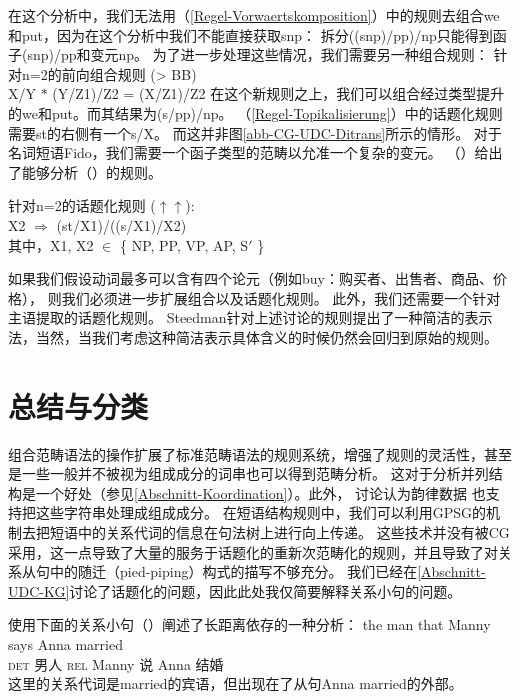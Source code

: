 在这个分析中，我们无法用（\ref{Regel-Vorwaertskomposition}）中的规则去组合we和put，因为在这个分析中我们不能直接获取s\bs np：
拆分((s\bs np)/pp)/np只能得到函子(s\bs np)/pp和变元np。
为了进一步处理这些情况，我们需要另一种组合规则：
\ea
针对n=2的前向组合规则 (> BB)\\
X/Y $*$ (Y/Z1)/Z2 = (X/Z1)/Z2
\z
在这个新规则之上，我们可以组合经过类型提升的we和put。而其结果为(s/pp)/np。
（\ref{Regel-Topikalisierung}）中的话题化规则需要st的右侧有一个s/X。
而这并非图\ref{abb-CG-UDC-Ditrans}所示的情形。
对于名词短语Fido，我们需要一个函子类型的范畴以允准一个复杂的变元。
（）给出了能够分析（）的规则。

\ea
\label{Regel-Topikalisierung-zwei}
针对n=2的话题化规则
 ($\uparrow\uparrow$\isc{$\uparrow\uparrow$}\is{$\uparrow\uparrow$}):\\
X2 $\Rightarrow$ (st/X1)/((s/X1)/X2)\\
其中，X1, X2 $\in$ \{ NP, PP, VP, AP, S$'$ \}
\z

\noindent
如果我们假设动词最多可以含有四个论元（例如buy：购买者、出售者、商品、价格），
则我们必须进一步扩展组合以及话题化规则。
此外，我们还需要一个针对主语提取的话题化规则\citep[]{Pollard88a}。
Steedman针对上述讨论的规则提出了一种简洁的表示法，当然，当我们考虑这种简洁表示具体含义的时候仍然会回归到原始的规则。 

\section{总结与分类}
\label{Abschnitt-Relativsaetze-CG}\label{Abschnitt-Ratte-CG}\label{sec-pied-piping-cg}

组合范畴语法的操作扩展了标准范畴语法的规则系统，增强了规则的灵活性，甚至是一些一般并不被视为组成成分的词串也可以得到范畴分析。
这对于分析并列结构是一个好处（参见\ref{Abschnitt-Koordination}）。此外， \citet{Steedman91a}讨论认为韵律数据
也支持把这些字符串处理成组成成分。
在短语结构规则中，我们可以利用GPSG的机制去把短语中的关系代词的信息在句法树上进行向上传递。
这些技术并没有被CG采用，这一点导致了大量的服务于话题化的重新次范畴化的规则，并且导致了对关系从句中的随迁（pied-piping）构式的描写不够充分。
我们已经在\ref{Abschnitt-UDC-KG}讨论了话题化的问题，因此此处我仅简要解释关系小句的问题。

 \citet[]{SB2006a-u}使用下面的关系小句（）阐述了长距离依存的一种分析：
\ea
\gll the man  that Manny says Anna married \\
     \textsc{det} 男人 \textsc{rel} Manny 说 Anna 结婚 \\
\z
这里的关系代词是married的宾语，但出现在了从句Anna married的外部。

